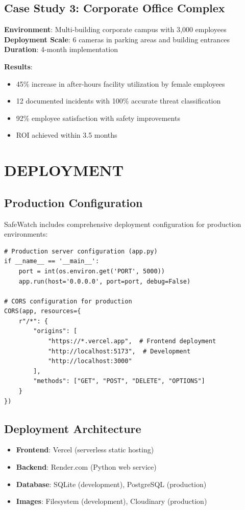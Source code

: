 \documentclass[12pt,a4paper]{article}
\begin{document}
\subsection{Case Study 3: Corporate Office Complex}

\textbf{Environment}: Multi-building corporate campus with 3,000 employees
\textbf{Deployment Scale}: 6 cameras in parking areas and building entrances
\textbf{Duration}: 4-month implementation

\textbf{Results}:
\begin{itemize}
    \item 45\% increase in after-hours facility utilization by female employees
    \item 12 documented incidents with 100\% accurate threat classification
    \item 92\% employee satisfaction with safety improvements
    \item ROI achieved within 3.5 months
\end{itemize}

\newpage
\section{DEPLOYMENT}

\subsection{Production Configuration}
SafeWatch includes comprehensive deployment configuration for production environments:

\begin{lstlisting}
# Production server configuration (app.py)
if __name__ == '__main__':
    port = int(os.environ.get('PORT', 5000))
    app.run(host='0.0.0.0', port=port, debug=False)

# CORS configuration for production
CORS(app, resources={
    r"/*": {
        "origins": [
            "https://*.vercel.app",  # Frontend deployment
            "http://localhost:5173",  # Development
            "http://localhost:3000"
        ],
        "methods": ["GET", "POST", "DELETE", "OPTIONS"]
    }
})
\end{lstlisting}

\subsection{Deployment Architecture}
\begin{itemize}
    \item \textbf{Frontend}: Vercel (serverless static hosting)
    \item \textbf{Backend}: Render.com (Python web service)  
    \item \textbf{Database}: SQLite (development), PostgreSQL (production)
    \item \textbf{Images}: Filesystem (development), Cloudinary (production)
\end{itemize}
\end{document}
